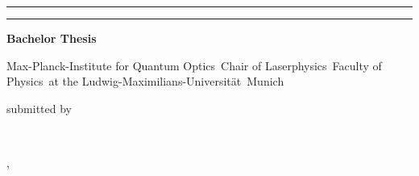 \begin{titlepage}   

    {\parindent0cm
    \rule{\linewidth}{.4ex}}  
  \begin{center}
    {\sffamily \bfseries \Huge \renewcommand{\baselinestretch}{1.18}\selectfont\parbox{0.95\linewidth}{\centering \getTitleEN}}
  \end{center}
    \rule{\linewidth}{.4ex}
  

  \begin{center}
    {\rmfamily \bfseries \Large Bachelor Thesis}


    {\large
     Max-Planck-Institute for Quantum Optics\
     Chair of Laserphysics\
     Faculty of Physics\
     at the Ludwig-Maximilians-Universität\
     Munich


     submitted by \

     {\rmfamily \bfseries \Large \getAuthor} \


     \vspace*{\stretch{2}}
     \getPrintLocationEN, \getSubmissionDateEN
     }
  \end{center}
  
\end{titlepage}
